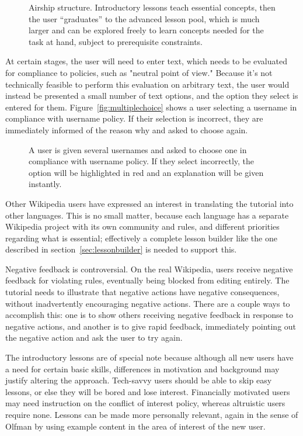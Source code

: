 \documentclass{acm_proc_article-sp}
\begin{document}
\begin{figure}
\centering
{}
\caption{Airship structure. Introductory lessons teach essential concepts, then the user ``graduates'' to the advanced lesson pool, which is much larger and can be explored freely to learn concepts needed for the task at hand, subject to prerequisite constraints.}
\label{fig:airship}
\end{figure}

At certain stages, the user will need to enter text, which needs to be evaluated for compliance to policies, such as "neutral point of view." Because it's not technically feasible to perform this evaluation on arbitrary text, the user would instead be presented a small number of text options, and the option they select is entered for them. Figure~\ref{fig:multiplechoice} shows a user selecting a username in compliance with username policy. If their selection is incorrect, they are immediately informed of the reason why and asked to choose again.

\begin{figure}
\centering
{}
\caption{A user is given several usernames and asked to choose one in compliance with username policy. If they select incorrectly, the option will be highlighted in red and an explanation will be given instantly.}
\label{fig:talktemplate}
\end{figure}

Other Wikipedia users have expressed an interest in translating the tutorial into other languages. This is no small matter, because each language has a separate Wikipedia project with its own community and rules, and different priorities regarding what is essential; effectively a complete lesson builder like the one described in section~\ref{sec:lessonbuilder} is needed to support this.

Negative feedback is controversial. On the real Wikipedia, users receive negative feedback for violating rules, eventually being blocked from editing entirely. The tutorial needs to illustrate that negative actions have negative consequences, without inadvertently encouraging negative actions. There are a couple ways to accomplish this: one is to show others receiving negative feedback in response to negative actions, and another is to give rapid feedback, immediately pointing out the negative action and ask the user to try again.

The introductory lessons are of special note because although all new users have a need for certain basic skills, differences in motivation and background may justify altering the approach. Tech-savvy users should be able to skip easy lessons, or else they will be bored and lose interest.  Financially motivated users may need instruction on the conflict of interest policy, whereas altruistic users require none. Lessons can be made more personally relevant, again in the sense of Olfman\cite{Olfman:1991} by using example content in the area of interest of the new user.
\end{document}
